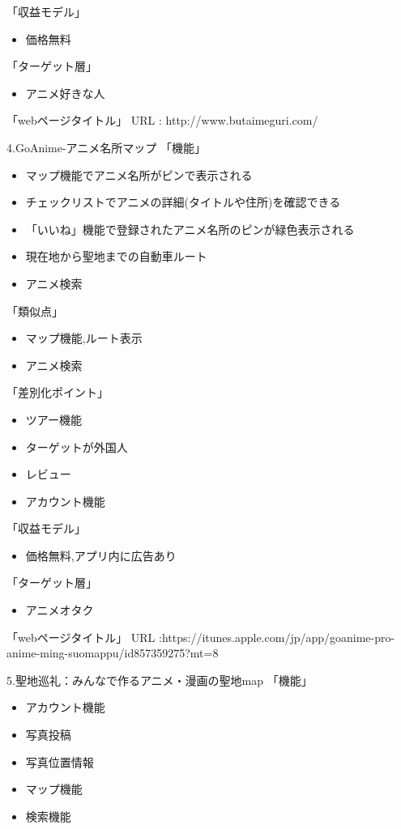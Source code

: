 「収益モデル」
\begin{itemize}
\item 価格無料
\end{itemize}
「ターゲット層」
\begin{itemize}
\item アニメ好きな人
\end{itemize}
「webページタイトル」
URL : http://www.butaimeguri.com/
\par
4.GoAnime-アニメ名所マップ
「機能」
\begin{itemize}
\item マップ機能でアニメ名所がピンで表示される
\item チェックリストでアニメの詳細(タイトルや住所)を確認できる
\item 「いいね」機能で登録されたアニメ名所のピンが緑色表示される
\item 現在地から聖地までの自動車ルート
\item アニメ検索
\end{itemize}
「類似点」
\begin{itemize}
\item マップ機能,ルート表示
\item アニメ検索
\end{itemize}
「差別化ポイント」
\begin{itemize}
\item ツアー機能
\item ターゲットが外国人
\item レビュー
\item アカウント機能
\end{itemize}
「収益モデル」
\begin{itemize}
\item 価格無料,アプリ内に広告あり
\end{itemize}
「ターゲット層」
\begin{itemize}
\item アニメオタク
\end{itemize}
「webページタイトル」
URL :https://itunes.apple.com/jp/app/goanime-pro-anime-ming-suomappu/id857359275?mt=8
\par
5.聖地巡礼：みんなで作るアニメ・漫画の聖地map
「機能」
\begin{itemize}
\item アカウント機能
\item 写真投稿
\item 写真位置情報
\item マップ機能
\item 検索機能
\end{itemize}
